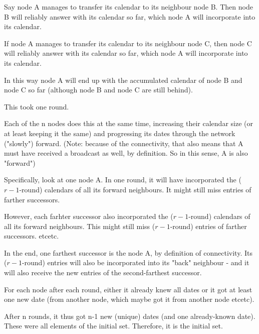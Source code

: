 \documentclass[12pt,a4paper,titlepage,oneside]{article}
\begin{document}
Say node A manages to transfer its calendar to its neighbour node B. Then node B will reliably answer with its calendar so far, which node A will incorporate into its calendar.\par
If node A manages to transfer its calendar to its neighbour node C, then node C will reliably answer with its calendar so far, which node A will incorporate into its calendar.\par
In this way node A will end up with the accumulated calendar of node B and node C so far (although node B and node C are still behind).\par
This took one round.\par
Each of the n nodes does this at the same time, increasing their calendar size (or at least keeping it the same) and progressing its dates through the network ("slowly") forward. (Note: because of the connectivity, that also means that A must have received a broadcast as well, by definition. So in this sense, A is also "forward")\par
Specifically, look at one node A. In one round, it will have incorporated the ($r-1$-round) calendars of all its forward neighbours. It might still miss entries of farther successors.\par
However, each farhter successor also incorporated the ($r-1$-round) calendars of all its forward neighbours. This might still miss ($r-1$-round) entries of farther successors. etcetc.\par
In the end, one farthest successor is the node A, by definition of connectivity. Its ($r-1$-round) entries will also be incorporated into its "back" neighbour - and it will also receive the new entries of the second-farthest successor.\par
For each node after each round, either it already knew all dates or it got at least one new date (from another node, which maybe got it from another node etcetc).\par
After n rounds, it thus got n-1 new (unique) dates (and one already-known date). These were all elements of the initial set. Therefore, it is the initial set.

\end{document}
